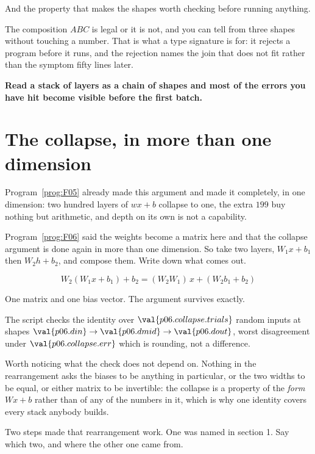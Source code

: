 \begin{fr}
And the property that makes the shapes worth checking before running anything.

The composition $ABC$ is legal or it is not, and you can tell from three
shapes without touching a number. That is what a type signature is for: it
rejects a program before it runs, and the rejection names the join that does
not fit rather than the symptom fifty lines later.

\textbf{Read a stack of layers as a chain of shapes and most of the errors you
have hit become visible before the first batch.}
\end{fr}

\section{The collapse, in more than one dimension}
\label{sec:P06-collapse}

\begin{fr}
Program~\ref{prog:F05} already made this argument and made it completely, in
one dimension: two hundred layers of $w x + b$ collapse to one, the extra
$199$ buy nothing but arithmetic, and depth on its own is not a capability.

Program~\ref{prog:F06} said the weights become a matrix here and that the
collapse argument is done again in more than one dimension. So take two layers,
$W_1 x + b_1$ then
$W_2 h + b_2$, and compose them. Write down what comes out.
\dotline
\nextframe
\end{fr}

\begin{fr}
\begin{ansblock}
\[ W_2(W_1x + b_1) + b_2 = (W_2W_1)\,x + (W_2b_1 + b_2) \]
\end{ansblock}

One matrix and one bias vector. The argument survives exactly.

The script checks the identity over $\val{p06.collapse.trials}$ random inputs
at shapes $\val{p06.din} \to \val{p06.dmid} \to \val{p06.dout}$, worst
disagreement under $\val{p06.collapse.err}$ \dash{} which is rounding, not a
difference.

Worth noticing what the check does not depend on. Nothing in the rearrangement
asks the biases to be anything in particular, or the two widths to be equal, or
either matrix to be invertible: the collapse is a property of the \emph{form}
$Wx + b$ rather than of any of the numbers in it, which is why one identity
covers every stack anybody builds.

Two steps made that rearrangement work. One was named in section 1. Say which
two, and where the other one came from.
\dotline
\nextframe
\end{fr}

